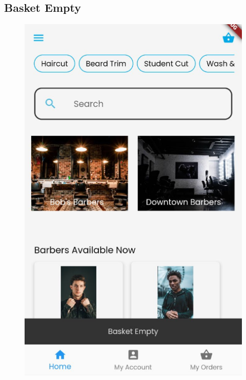 \documentclass[12pt]{article}
\begin{document}
	\subsection{Basket Empty}
	\label{app-image: basket-empty}
	\begin{figure}[H]
		\centering
		\includegraphics[scale=0.4]{images/basket-empty.png}
	\end{figure}
\end{document}
